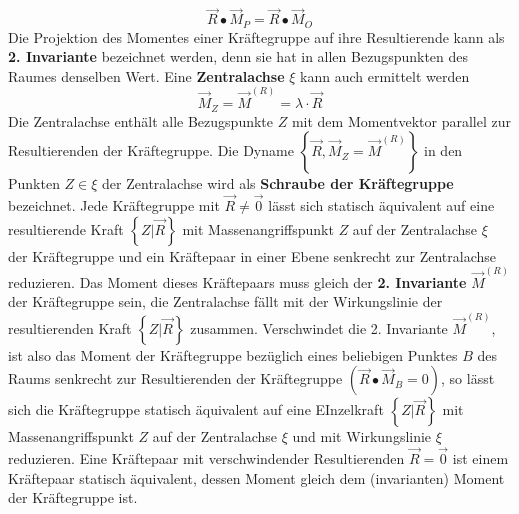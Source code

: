 \begin{equation}
\boxed{\overrightarrow{R}\bullet \overrightarrow{M}_P=\overrightarrow{R}\bullet \overrightarrow{M}_O}
\end{equation}
Die Projektion des Momentes einer Kräftegruppe auf ihre Resultierende kann als \textbf{2. Invariante} bezeichnet werden, denn sie hat in allen Bezugspunkten des Raumes denselben Wert. Eine \textbf{Zentralachse} $\xi$ kann auch ermittelt werden
\begin{equation}
\boxed{\overrightarrow{M}_Z=\overrightarrow{M}^{\left(R\right)}=\lambda\cdot \overrightarrow{R}}
\end{equation}
Die Zentralachse enthält alle Bezugspunkte $Z$ mit dem Momentvektor parallel zur Resultierenden der Kräftegruppe. Die Dyname $\left\{\overrightarrow{R}, \overrightarrow{M}_Z=\overrightarrow{M}^{\left(R\right)}\right\}$ in den Punkten $Z\in \xi$ der Zentralachse wird als \textbf{Schraube der Kräftegruppe} bezeichnet.  
\newline\newline
Jede Kräftegruppe mit $\overrightarrow{R}\neq \overrightarrow{0}$ lässt sich statisch äquivalent auf eine resultierende Kraft $\left\{Z|\overrightarrow{R}\right\}$ mit Massenangriffspunkt $Z$ auf der Zentralachse $\xi$ der Kräftegruppe und ein Kräftepaar in einer Ebene senkrecht zur Zentralachse reduzieren. Das Moment dieses Kräftepaars muss gleich der \textbf{2. Invariante} $\overrightarrow{M}^{\left(R\right)}$ der Kräftegruppe sein, die Zentralachse fällt mit der Wirkungslinie der resultierenden Kraft $\left\{Z|\overrightarrow{R}\right\}$ zusammen.
\newline\newline 
Verschwindet die 2. Invariante $\overrightarrow{M}^{\left(R\right)}$, ist also das Moment der Kräftegruppe bezüglich eines beliebigen Punktes $B$ des Raums senkrecht zur Resultierenden der Kräftegruppe $\left(\overrightarrow{R}\bullet \overrightarrow{M}_B=0\right)$, so lässt sich die Kräftegruppe statisch äquivalent auf eine EInzelkraft $\left\{Z|\overrightarrow{R}\right\}$ mit Massenangriffspunkt $Z$ auf der Zentralachse $\xi$ und mit Wirkungslinie $\xi$ reduzieren. Eine Kräftepaar mit verschwindender Resultierenden $\overrightarrow{R}=\overrightarrow{0}$ ist einem Kräftepaar statisch äquivalent, dessen Moment gleich dem (invarianten) Moment der Kräftegruppe ist.
\newline\newline
